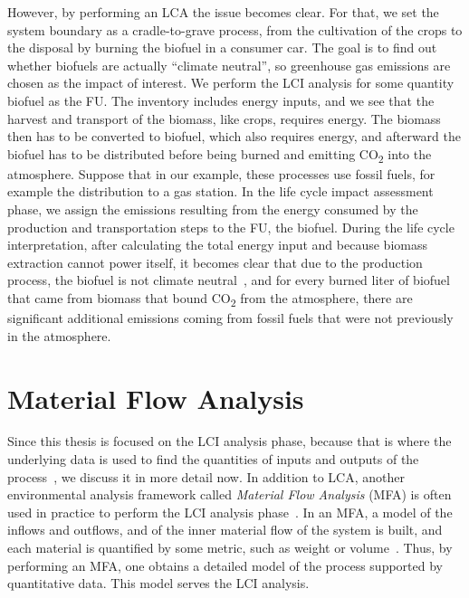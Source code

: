    
    However, by performing an LCA the issue becomes clear.
    For that, we set the system boundary as a cradle-to-grave process, from the cultivation of the crops to the disposal by burning the biofuel in a consumer car.
    The goal is to find out whether biofuels are actually \enquote{climate neutral}, so greenhouse gas emissions are chosen as the impact of interest.
    We perform the LCI analysis for some quantity biofuel as the FU.
    The inventory includes energy inputs, and we see that the harvest and transport of the biomass, like crops, requires energy.
    The biomass then has to be converted to biofuel, which also requires energy, and afterward the biofuel has to be distributed before being burned and emitting CO\textsubscript{2} into the atmosphere.
    Suppose that in our example, these processes use fossil fuels, for example the distribution to a gas station.
    In the life cycle impact assessment phase, we assign the emissions resulting from the energy consumed by the production and transportation steps to the FU, the biofuel.
    During the life cycle interpretation, after calculating the total energy input and because biomass extraction cannot power itself, it becomes clear that due to the production process, the biofuel is not climate neutral~\autocite{bjorn2018}, and for every burned liter of biofuel that came from biomass that bound CO\textsubscript{2} from the atmosphere, there are significant additional emissions coming from fossil fuels that were not previously in the atmosphere.
    
    
    
    \section{Material Flow Analysis}
    
    
    
    Since this thesis is focused on the LCI analysis phase, because that is where the underlying data is used to find the quantities of inputs and outputs of the process~\autocite{grahl}, we discuss it in more detail now.
    In addition to LCA, another environmental analysis framework called \emph{Material Flow Analysis} (MFA) is often used in practice to perform the LCI analysis phase~\autocite{brunner2017}.
    In an MFA, a model of the inflows and outflows, and of the inner material flow of the system is built, and each material is quantified by some metric, such as weight or volume~\autocite{brunner2017}.
    Thus, by performing an MFA, one obtains a detailed model of the process supported by quantitative data.
    This model serves the LCI analysis.
    

